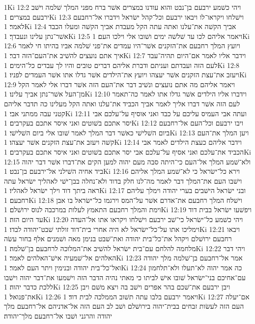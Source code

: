 1Ki 12:2  ויהי כשׁמע ירבעם בן־נבט והוא עודנו במצרים אשׁר ברח מפני המלך שׁלמה וישׁב ירבעם במצרים׃
1Ki 12:3  וישׁלחו ויקראו־לו ויבאו ירבעם וכל־קהל ישׂראל וידברו אל־רחבעם לאמר׃
1Ki 12:4  אביך הקשׁה את־עלנו ואתה עתה הקל מעבדת אביך הקשׁה ומעלו הכבד אשׁר־נתן עלינו ונעבדך׃
1Ki 12:5  ויאמר אליהם לכו עד שׁלשׁה ימים ושׁובו אלי וילכו העם׃
1Ki 12:6  ויועץ המלך רחבעם את־הזקנים אשׁר־היו עמדים את־פני שׁלמה אביו בהיתו חי לאמר איך אתם נועצים להשׁיב את־העם־הזה דבר׃
1Ki 12:7  וידבר אליו לאמר אם־היום תהיה־עבד לעם הזה ועבדתם ועניתם ודברת אליהם דברים טובים והיו לך עבדים כל־הימים׃
1Ki 12:8  ויעזב את־עצת הזקנים אשׁר יעצהו ויועץ את־הילדים אשׁר גדלו אתו אשׁר העמדים לפניו׃
1Ki 12:9  ויאמר אליהם מה אתם נועצים ונשׁיב דבר את־העם הזה אשׁר דברו אלי לאמר הקל מן־העל אשׁר־נתן אביך עלינו׃
1Ki 12:10  וידברו אליו הילדים אשׁר גדלו אתו לאמר כה־תאמר לעם הזה אשׁר דברו אליך לאמר אביך הכביד את־עלנו ואתה הקל מעלינו כה תדבר אליהם קטני עבה ממתני אבי׃
1Ki 12:11  ועתה אבי העמיס עליכם על כבד ואני אוסיף על־עלכם אבי יסר אתכם בשׁוטים ואני איסר אתכם בעקרבים׃
1Ki 12:12  ויבו ירבעם וכל־העם אל־רחבעם ביום השׁלישׁי כאשׁר דבר המלך לאמר שׁובו אלי ביום השׁלישׁי׃
1Ki 12:13  ויען המלך את־העם קשׁה ויעזב את־עצת הזקנים אשׁר יעצהו׃
1Ki 12:14  וידבר אליהם כעצת הילדים לאמר אבי הכביד את־עלכם ואני אסיף על־עלכם אבי יסר אתכם בשׁוטים ואני איסר אתכם בעקרבים׃
1Ki 12:15  ולא־שׁמע המלך אל־העם כי־היתה סבה מעם יהוה למען הקים את־דברו אשׁר דבר יהוה ביד אחיה השׁילני אל־ירבעם בן־נבט׃
1Ki 12:16  וירא כל־ישׂראל כי לא־שׁמע המלך אליהם וישׁבו העם את־המלך דבר לאמר מה־לנו חלק בדוד ולא־נחלה בבן־ישׁי לאהליך ישׂראל עתה ראה ביתך דוד וילך ישׂראל לאהליו׃
1Ki 12:17  ובני ישׂראל הישׁבים בערי יהודה וימלך עליהם רחבעם׃
1Ki 12:18  וישׁלח המלך רחבעם את־אדרם אשׁר על־המס וירגמו כל־ישׂראל בו אבן וימת והמלך רחבעם התאמץ לעלות במרכבה לנוס ירושׁלם׃
1Ki 12:19  ויפשׁעו ישׂראל בבית דוד עד היום הזה׃
1Ki 12:20  ויהי כשׁמע כל־ישׂראל כי־שׁב ירבעם וישׁלחו ויקראו אתו אל־העדה וימליכו אתו על־כל־ישׂראל לא היה אחרי בית־דוד זולתי שׁבט־יהודה לבדו׃
1Ki 12:21  ויבאו רחבעם ירושׁלם ויקהל את־כל־בית יהודה ואת־שׁבט בנימן מאה ושׁמנים אלף בחור עשׂה מלחמה להלחם עם־בית ישׂראל להשׁיב את־המלוכה לרחבעם בן־שׁלמה׃
1Ki 12:22  ויהי דבר האלהים אל־שׁמעיה אישׁ־האלהים לאמר׃
1Ki 12:23  אמר אל־רחבעם בן־שׁלמה מלך יהודה ואל־כל־בית יהודה ובנימין ויתר העם לאמר׃
1Ki 12:24  כה אמר יהוה לא־תעלו ולא־תלחמון עם־אחיכם בני־ישׂראל שׁובו אישׁ לביתו כי מאתי נהיה הדבר הזה וישׁמעו את־דבר יהוה וישׁבו ללכת כדבר יהוה׃
1Ki 12:25  ויבן ירבעם את־שׁכם בהר אפרים וישׁב בה ויצא משׁם ויבן את־פנואל׃
1Ki 12:26  ויאמר ירבעם בלבו עתה תשׁוב הממלכה לבית דוד׃
1Ki 12:27  אם־יעלה העם הזה לעשׂות זבחים בבית־יהוה בירושׁלם ושׁב לב העם הזה אל־אדניהם אל־רחבעם מלך יהודה והרגני ושׁבו אל־רחבעם מלך־יהודה׃
